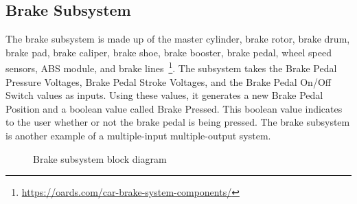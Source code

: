 \documentclass[journal,twoside,web]{ieeecolor}
\begin{document}
  \subsection{Brake Subsystem}
 The brake subsystem is made up of the master cylinder, brake rotor, brake drum, brake pad, brake caliper, brake shoe, brake booster, brake pedal, wheel speed sensors, ABS module, and brake lines~\footnote{\url{https://oards.com/car-brake-system-components/}}. The subsystem takes the Brake Pedal Pressure Voltages, Brake Pedal Stroke Voltages, and the Brake Pedal On/Off Switch values as inputs. Using these values, it generates a new Brake Pedal Position and a boolean value called Brake Pressed. This boolean value indicates to the user whether or not the brake pedal is being pressed. The brake subsystem is another example of a multiple-input multiple-output system. 
 \begin{figure}[htbp]
    \centering
    \caption{Brake subsystem block diagram}
    \label{fig:brakeModelArchitecture}
\end{figure}
 
\end{document}
